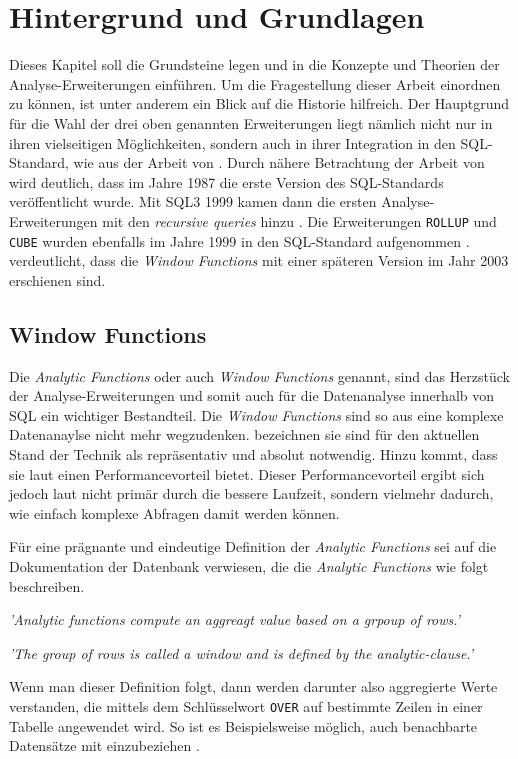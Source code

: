 \chapter{Hintergrund und Grundlagen}
\label{chap:hintergund_und_grundlagen} Dieses Kapitel soll die Grundsteine legen
und in die Konzepte und Theorien der Analyse-Erweiterungen einführen. Um die
Fragestellung dieser Arbeit einordnen zu können, ist unter anderem ein Blick auf
die Historie hilfreich. Der Hauptgrund für die Wahl der drei oben genannten
Erweiterungen liegt nämlich nicht nur in ihren vielseitigen Möglichkeiten, sondern
auch in ihrer Integration in den SQL-Standard, wie aus der Arbeit von \citet[S.~10]{grust2017advanced}.
Durch nähere Betrachtung der Arbeit von \cite{grust2017advanced} wird deutlich, dass
im Jahre 1987 die erste Version des SQL-Standards veröffentlicht wurde. Mit SQL3
1999 kamen dann die ersten Analyse-Erweiterungen mit den \textit{recursive
queries} hinzu \citep[S.~10]{grust2017advanced}. Die Erweiterungen \texttt{ROLLUP}
und \texttt{CUBE} wurden ebenfalls im Jahre 1999 in den SQL-Standard aufgenommen
\citep[Kapitel 9.12]{melton2001sql}. \citet[S.~10]{grust2017advanced} verdeutlicht,
dass die \textit{Window Functions} mit einer späteren Version im Jahr 2003 erschienen
sind.

\section{Window Functions}
\label{sec:window_functions} Die \textit{Analytic Functions} oder auch \textit{Window
Functions} genannt, sind das Herzstück der Analyse-Erweiterungen und somit auch
für die Datenanalyse innerhalb von SQL ein wichtiger Bestandteil. Die \textit{Window
Functions} sind so aus eine komplexe Datenanaylse nicht mehr wegzudenken. \citet[Abstract]{cao2012optimization}
bezeichnen sie sind für den aktuellen Stand der Technik als repräsentativ und absolut notwendig.
Hinzu kommt, dass sie laut \citet[Kapitel 8]{kellenberger2019expert} einen Performancevorteil
bietet. Dieser Performancevorteil ergibt sich jedoch laut \citet[Kapitel 8]{kellenberger2019expert}
nicht primär durch die bessere Laufzeit, sondern vielmehr dadurch, wie einfach
komplexe Abfragen damit werden können.

Für eine prägnante und eindeutige Definition der \textit{Analytic Functions} sei
auf die Dokumentation der \citet{oracle} Datenbank verwiesen, die die \textit{Analytic
Functions} wie folgt beschreiben.
\begin{center}
	\textit{ 'Analytic functions compute an aggreagt value based on a grpoup of
	rows.' } \\ \cite{oracle}

	\textit{ 'The group of rows is called a window and is defined by the analytic-clause.'
	} \\ \cite{oracle}
\end{center}
Wenn man dieser Definition folgt, dann werden darunter also aggregierte Werte
verstanden, die mittels dem Schlüsselwort \texttt{OVER} auf bestimmte Zeilen in
einer Tabelle angewendet wird. So ist es Beispielsweise möglich, auch
benachbarte Datensätze mit einzubeziehen \citep{oracle}.

